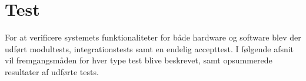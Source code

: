 \chapter{Test}
For at verificere systemets funktionaliteter for både hardware og software blev der udført modultests, integrationstests samt en endelig accepttest. I følgende afsnit vil fremgangsmåden for hver type test blive beskrevet, samt opsummerede resultater af udførte tests. 